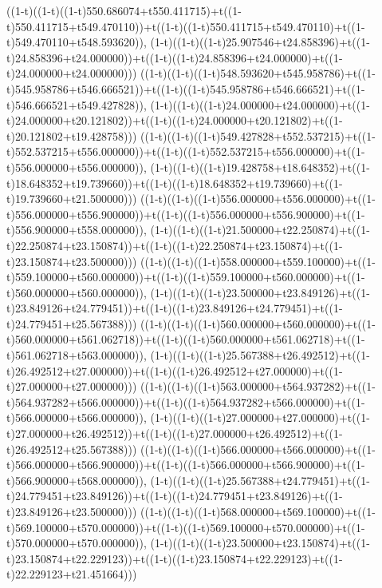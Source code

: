 ((1-t)((1-t)((1-t)550.686074+t550.411715)+t((1-t)550.411715+t549.470110))+t((1-t)((1-t)550.411715+t549.470110)+t((1-t)549.470110+t548.593620)),                                     (1-t)((1-t)((1-t)25.907546+t24.858396)+t((1-t)24.858396+t24.000000))+t((1-t)((1-t)24.858396+t24.000000)+t((1-t)24.000000+t24.000000)))
((1-t)((1-t)((1-t)548.593620+t545.958786)+t((1-t)545.958786+t546.666521))+t((1-t)((1-t)545.958786+t546.666521)+t((1-t)546.666521+t549.427828)),                                     (1-t)((1-t)((1-t)24.000000+t24.000000)+t((1-t)24.000000+t20.121802))+t((1-t)((1-t)24.000000+t20.121802)+t((1-t)20.121802+t19.428758)))
((1-t)((1-t)((1-t)549.427828+t552.537215)+t((1-t)552.537215+t556.000000))+t((1-t)((1-t)552.537215+t556.000000)+t((1-t)556.000000+t556.000000)),                                     (1-t)((1-t)((1-t)19.428758+t18.648352)+t((1-t)18.648352+t19.739660))+t((1-t)((1-t)18.648352+t19.739660)+t((1-t)19.739660+t21.500000)))
((1-t)((1-t)((1-t)556.000000+t556.000000)+t((1-t)556.000000+t556.900000))+t((1-t)((1-t)556.000000+t556.900000)+t((1-t)556.900000+t558.000000)),                                     (1-t)((1-t)((1-t)21.500000+t22.250874)+t((1-t)22.250874+t23.150874))+t((1-t)((1-t)22.250874+t23.150874)+t((1-t)23.150874+t23.500000)))
((1-t)((1-t)((1-t)558.000000+t559.100000)+t((1-t)559.100000+t560.000000))+t((1-t)((1-t)559.100000+t560.000000)+t((1-t)560.000000+t560.000000)),                                     (1-t)((1-t)((1-t)23.500000+t23.849126)+t((1-t)23.849126+t24.779451))+t((1-t)((1-t)23.849126+t24.779451)+t((1-t)24.779451+t25.567388)))
((1-t)((1-t)((1-t)560.000000+t560.000000)+t((1-t)560.000000+t561.062718))+t((1-t)((1-t)560.000000+t561.062718)+t((1-t)561.062718+t563.000000)),                                     (1-t)((1-t)((1-t)25.567388+t26.492512)+t((1-t)26.492512+t27.000000))+t((1-t)((1-t)26.492512+t27.000000)+t((1-t)27.000000+t27.000000)))
((1-t)((1-t)((1-t)563.000000+t564.937282)+t((1-t)564.937282+t566.000000))+t((1-t)((1-t)564.937282+t566.000000)+t((1-t)566.000000+t566.000000)),                                     (1-t)((1-t)((1-t)27.000000+t27.000000)+t((1-t)27.000000+t26.492512))+t((1-t)((1-t)27.000000+t26.492512)+t((1-t)26.492512+t25.567388)))
((1-t)((1-t)((1-t)566.000000+t566.000000)+t((1-t)566.000000+t566.900000))+t((1-t)((1-t)566.000000+t566.900000)+t((1-t)566.900000+t568.000000)),                                     (1-t)((1-t)((1-t)25.567388+t24.779451)+t((1-t)24.779451+t23.849126))+t((1-t)((1-t)24.779451+t23.849126)+t((1-t)23.849126+t23.500000)))
((1-t)((1-t)((1-t)568.000000+t569.100000)+t((1-t)569.100000+t570.000000))+t((1-t)((1-t)569.100000+t570.000000)+t((1-t)570.000000+t570.000000)),                                     (1-t)((1-t)((1-t)23.500000+t23.150874)+t((1-t)23.150874+t22.229123))+t((1-t)((1-t)23.150874+t22.229123)+t((1-t)22.229123+t21.451664)))
